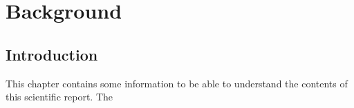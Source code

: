 \section{Background}
\label{chapter:background}


\subsection{Introduction}
This chapter contains some information to be able to understand the contents of this scientific report.
The 




